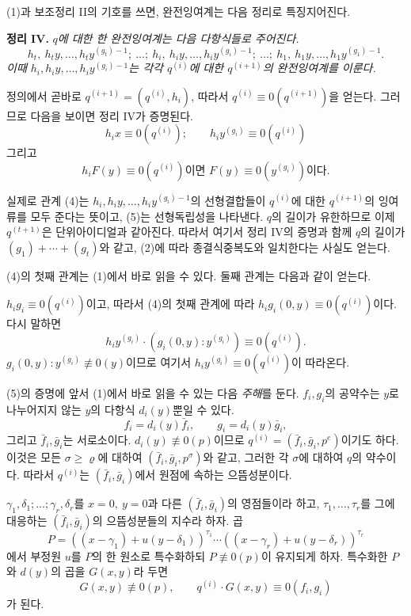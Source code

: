 (1)과 보조정리 II의 기호를 쓰면, 완전잉여계는 다음 정리로 특징지어진다.

\textbf{정리 IV.} \emph{\(q\)에 대한 한 완전잉여계는 다음 다항식들로 주어진다.}
\[
h_t,\ h_ty,\ldots,h_ty^{(g_t)-1};\ \ldots;\ h_i,\ h_iy,\ldots,h_iy^{(g_i)-1};\ \ldots;\ h_1,\ h_1y,\ldots,h_1y^{(g_1)-1}.
\]
\emph{이때 \(h_i,h_iy,\ldots,h_iy^{(g_i)-1}\)는 각각 \(q^{(i)}\)에 대한 \(q^{(i+1)}\)의 완전잉여계를 이룬다.}

정의에서 곧바로 \(q^{(i+1)}=(q^{(i)},h_i)\), 따라서 \(q^{(i)}\equiv0(q^{(i+1)})\)을 얻는다. 그러므로 다음을 보이면 정리 IV가 증명된다.
\begin{equation}
\tag{4}
h_i x\equiv0(q^{(i)});\qquad h_i y^{(g_i)}\equiv0(q^{(i)})
\end{equation}
그리고
\begin{equation}
\tag{5}
\text{\(h_iF(y)\equiv0(q^{(i)})\)이면 \(F(y)\equiv0(y^{(g_i)})\)이다.}
\end{equation}

실제로 관계 (4)는 \(h_i,h_iy,\ldots,h_iy^{(g_i)-1}\)의 선형결합들이 \(q^{(i)}\)에 대한 \(q^{(i+1)}\)의 잉여류를 모두 준다는 뜻이고, (5)는 선형독립성을 나타낸다. \(q\)의 길이가 유한하므로 이제 \(q^{(t+1)}\)은 단위아이디얼과 같아진다. 따라서 여기서 정리 IV의 증명과 함께 \(q\)의 길이가 \((g_1)+\cdots+(g_t)\)와 같고, (2)에 따라 종결식중복도와 일치한다는 사실도 얻는다.

(4)의 첫째 관계는 (1)에서 바로 읽을 수 있다. 둘째 관계는 다음과 같이 얻는다.

\(h_ig_i\equiv0(q^{(i)})\)이고, 따라서 (4)의 첫째 관계에 따라 \(h_ig_i(0,y)\equiv0(q^{(i)})\)이다. 다시 말하면
\[
h_iy^{(g_i)}\cdot(g_i(0,y):y^{(g_i)})\equiv0(q^{(i)}).
\]
\(g_i(0,y):y^{(g_i)}\not\equiv0(y)\)이므로 여기서 \(h_iy^{(g_i)}\equiv0(q^{(i)})\)이 따라온다.

(5)의 증명에 앞서 (1)에서 바로 읽을 수 있는 다음 \emph{주해}를 둔다. \(f_i,g_i\)의 공약수는 \(y\)로 나누어지지 않는 \(y\)의 다항식 \(d_i(y)\)뿐일 수 있다.
\[
f_i=d_i(y)\bar f_i,\qquad g_i=d_i(y)\bar g_i,
\]
그리고 \(\bar f_i,\bar g_i\)는 서로소이다. \(d_i(y)\not\equiv0(p)\)이므로 \(q^{(i)}=(\bar f_i,\bar g_i,p^e)\)이기도 하다. 이것은 모든 \(\sigma\geq\varrho\)에 대하여 \((\bar f_i,\bar g_i,p^\sigma)\)와 같고, 그러한 각 \(\sigma\)에 대하여 \(q\)의 약수이다. 따라서 \(q^{(i)}\)는 \((\bar f_i,\bar g_i)\)에서 원점에 속하는 으뜸성분이다.

\(\gamma_1,\delta_1;\ldots;\gamma_r,\delta_r\)를 \(x=0,\ y=0\)과 다른 \((\bar f_i,\bar g_i)\)의 영점들이라 하고, \(\tau_1,\ldots,\tau_r\)를 그에 대응하는 \((\bar f_i,\bar g_i)\)의 으뜸성분들의 지수라 하자. 곱
\[
P=((x-\gamma_1)+u(y-\delta_1))^{\tau_1}\cdots
((x-\gamma_r)+u(y-\delta_r))^{\tau_r}
\]
에서 부정원 \(u\)를 \(P\)의 한 원소로 특수화하되 \(P\not\equiv0(p)\)이 유지되게 하자. 특수화한 \(P\)와 \(d(y)\)의 곱을 \(G(x,y)\)라 두면
\[
G(x,y)\not\equiv0(p),\qquad q^{(i)}\cdot G(x,y)\equiv0(f_i,g_i)
\]
가 된다.


